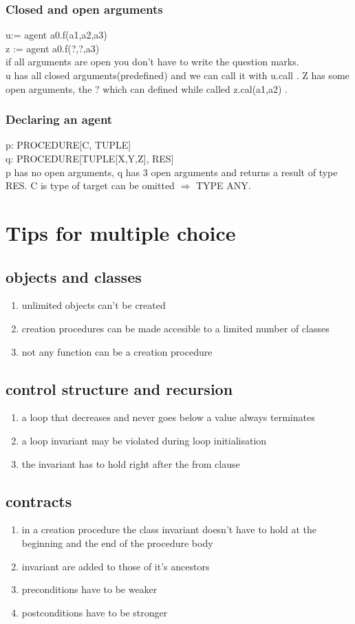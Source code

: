 \documentclass[11pt]{article}
\begin{document}
\subsubsection{Closed and open arguments}
u:= agent a0.f(a1,a2,a3)\\
z := agent a0.f(?,?,a3)\\
if all arguments are open you don't have to write the question marks.\\
u has all closed arguments(predefined) and we can call it with u.call   . Z has some open arguments, the ? which can defined while called z.cal(a1,a2)   .
\subsubsection{Declaring an agent}
p: PROCEDURE[C, TUPLE]\\
q: PROCEDURE[TUPLE[X,Y,Z], RES]\\
p has no open arguments, q has 3 open arguments and returns a result of type RES. C is type of target can be omitted $\Rightarrow$ TYPE ANY.
\section{Tips for multiple choice}
\subsection{objects and classes}
\begin{enumerate}
	\item unlimited objects can't be created
	\item creation procedures can be made accesible to a limited number of classes
	\item not any function can be a creation procedure
\end{enumerate}
\subsection{control structure and recursion}
\begin{enumerate}
	\item a loop that decreases and never goes below a value always terminates
	\item a loop invariant may be violated during loop initialisation\
	\item the invariant has to hold right after the from clause
\end{enumerate}
\subsection{contracts}
\begin{enumerate}
	\item in a creation procedure the class invariant doesn't have to hold at the beginning and the end of the procedure body
	\item invariant are added to those of it's ancestors
	\item preconditions have to be weaker
	\item postconditions have to be stronger
\end{enumerate}
\end{document}

